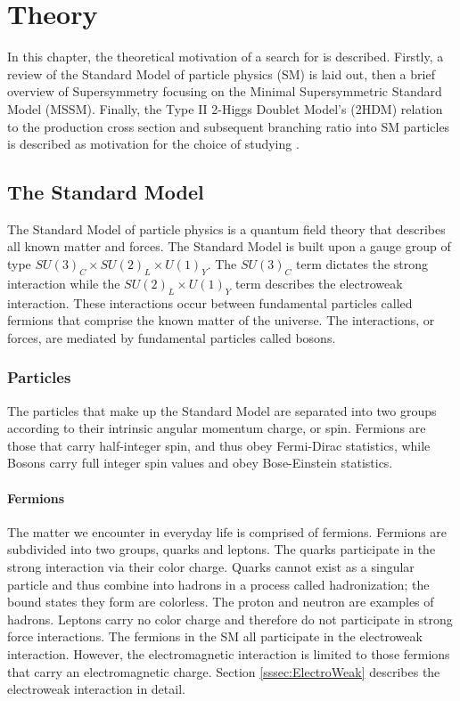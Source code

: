 \chapter{Theory}\label{sec:Theory}
    In this chapter, the theoretical motivation of a search for \HpmLong is described. Firstly, a review of the Standard Model of particle physics (SM) is laid out, then a brief overview of Supersymmetry focusing on the Minimal Supersymmetric Standard Model (MSSM). Finally, the Type II 2-Higgs Doublet Model's (2HDM) relation to the \Hpm production cross section and subsequent branching ratio into SM particles is described as motivation for the choice of studying \HpmLong.

\section{The Standard Model}\label{sec:SM}
	 The Standard Model of particle physics is a quantum field theory that describes all known matter and forces. The Standard Model is built upon a gauge group of type $SU(3)_C \times SU(2)_L \times U(1)_Y$. The $SU(3)_C$ term dictates the strong interaction while the $SU(2)_L \times U(1)_Y$ term describes the electroweak interaction. These interactions occur between fundamental particles called fermions that comprise the known matter of the universe. The interactions, or forces, are mediated by fundamental particles called bosons. 

	\subsection{Particles}\label{ssec:Particles}
		The particles that make up the Standard Model are separated into two groups according to their intrinsic angular momentum charge, or spin. Fermions are those that carry half-integer spin, and thus obey Fermi-Dirac statistics, while Bosons carry full integer spin values and obey Bose-Einstein statistics.
		
		\subsubsection{Fermions}\label{sssec:Fermions}
			The matter we encounter in everyday life is comprised of fermions. Fermions are subdivided into two groups, quarks and leptons. The quarks participate in the strong interaction via their color charge. Quarks cannot exist as a singular particle and thus combine into hadrons in a process called hadronization; the bound states they form are colorless. The proton and neutron are examples of hadrons. Leptons carry no color charge and therefore do not participate in strong force interactions. The fermions in the SM all participate in the electroweak interaction. However, the electromagnetic interaction is limited to those fermions that carry an electromagnetic charge. Section \ref{sssec:ElectroWeak} describes the electroweak interaction in detail.


